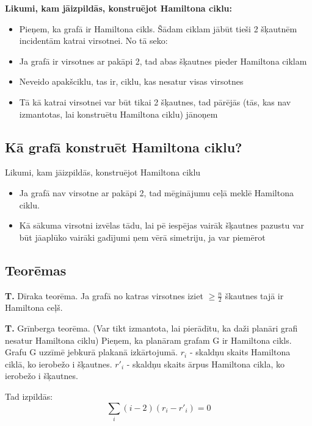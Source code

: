 \documentclass{article}
\begin{document}
\textbf{Likumi, kam jāizpildās, konstruējot Hamiltona ciklu:}
\begin{itemize}
	\item Pieņem, ka grafā ir Hamiltona cikls. Šādam ciklam jābūt tieši 2 šķautnēm incidentām katrai virsotnei. No tā seko:
	\item Ja grafā ir virsotnes ar pakāpi 2, tad abas šķautnes pieder Hamiltona ciklam
	\item Neveido apakšciklu, tas ir, ciklu, kas nesatur visas virsotnes
	\item Tā kā katrai virsotnei var būt tikai 2 šķautnes, tad pārējās (tās, kas nav izmantotas, lai konstruētu Hamiltona ciklu) jānoņem
\end{itemize}
	
\subsection{Kā grafā konstruēt Hamiltona ciklu?}
Likumi, kam jāizpildās, konstruējot Hamiltona ciklu
\begin{itemize}
	\item Ja grafā nav virsotne ar pakāpi 2, tad mēginājumu ceļā meklē Hamiltona ciklu.
	\item Kā sākuma virsotni izvēlas tādu, lai pē iespējas vairāk šķautnes pazustu var būt jāaplūko vairāki gadījumi ņem vērā simetriju, ja var piemērot
\end{itemize}
	
\subsection{Teorēmas}

\textbf{T. } Dīraka teorēma. Ja grafā no katras virsotnes iziet $\ge \frac{n}{2}$ škautnes tajā ir Hamiltona ceļš.

\textbf{T. } Grīnberga teorēma. (Var tikt izmantota, lai pierādītu, ka daži planāri grafi nesatur Hamiltona ciklu) Pieņem, ka planāram grafam G ir Hamiltona cikls. Grafu G uzzīmē jebkurā plakanā izkārtojumā.  $r_i$ - skaldņu skaits Hamiltona ciklā, ko ierobežo i šķautnes.  $r'_i$ - skaldņu skaits ārpus Hamiltona cikla, ko ierobežo i šķautnes.

Tad izpildās:
\begin{equation}
	\sum_{i}{}(i − 2)(r_i − r'_i ) = 0
\end{equation}
\end{document}
